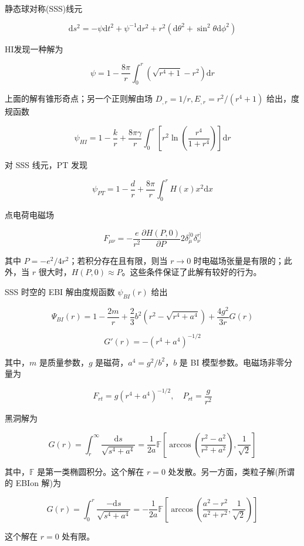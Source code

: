 \documentclass[aps,prl,preprint,groupedaddress,showkeys]{revtex4-2}
\begin{document}
静态球对称(SSS)线元

$$
\mathrm{d}s^2 = -\psi\mathrm{d}t^2 + \psi^{-1} \mathrm{d}r^2 + r^2\left(\mathrm{d}\theta^2+\sin^2\theta\mathrm{d}\phi^2 \right)
$$

HI发现一种解为\cite{hoffmann1937choice}

$$
\psi
=1-\frac{8\pi }{r } \int_{0}^{r} \left(\sqrt{r^4+1} - r^2 \right)\mathrm{d}r
$$

上面的解有锥形奇点；另一个正则解由场 $D_{,r}=1/r,E_{,r}=r^2/\left(r^4+1 \right) $ 给出，度规函数

$$
\psi_{HI}
=1-\frac{k }{r } + \frac{8\pi\gamma }{r } \int_{0}^{r} \left[r^2\ln\left(\frac{r^4 }{1+r^4 }  \right) \right] \mathrm{d}r
$$

对 SSS 线元，PT 发现\cite{pellicer1969nonlinear}

$$
\psi_{PT}
=1-\frac{d }{r } + \frac{8\pi }{r } \int_{0}^{r} H(x) x^2\mathrm{d}x
$$

点电荷电磁场

$$
F_{\mu\nu}
=-\frac{e }{r^2 } \frac{\partial H(P,0) }{\partial P } 2\delta_\mu^{[0}\delta_{\nu}^{r]}
$$

其中 $P=-e^2/4r^2$；若积分存在且有限，则当 $r\to 0$ 时电磁场张量是有限的；此外，当 $r$ 很大时，$H(P,0)\approx P$。这些条件保证了此解有较好的行为。

SSS 时空的 EBI 解由度规函数 $\psi_{BI}(r)$ 给出

$$
\Psi_{BI}(r)
=1-\frac{2m }{r } + \frac{2 }{3 } b^2\left(r^2-\sqrt{r^4+a^4} \right) + \frac{4g^2 }{3r } G(r)
$$

$$
G'(r)
=-\left(r^4+a^4 \right)^{-1/2}
$$

其中，$m$ 是质量参数，$g$ 是磁荷，$a^4=g^2/b^2$，$b$ 是 BI 模型参数。电磁场非零分量为

$$
F_{rt}
=g\left(r^4+a^4 \right)^{-1/2},\quad
P_{rt}
=\frac{g }{r^2 }
$$

黑洞解为

$$
G(r)
=\int_{r}^{\infty} \frac{\mathrm{d}s }{\sqrt{s^4+a^4} } 
=\frac{1 }{2a } \mathbb{F} \left[\arccos\left(\frac{r^2-a^2 }{r^2+a^2 }  \right) , \frac{1 }{\sqrt{2} }  \right]
$$

其中，$\mathbb{F}$ 是第一类椭圆积分。这个解在 $r=0$ 处发散。另一方面，类粒子解(所谓的 EBIon 解)为

$$
G(r)
=\int_{0}^{r} \frac{-\mathrm{d}s }{\sqrt{s^4+a^4} } 
=-\frac{1 }{2a } \mathbb{F}\left[\arccos\left(\frac{a^2-r^2 }{a^2+r^2 } , \frac{1 }{\sqrt{2} }  \right) \right]
$$

这个解在 $r=0$ 处有限。
\end{document}
